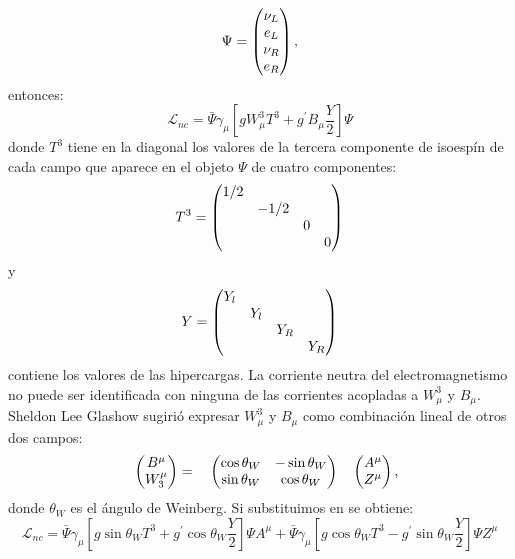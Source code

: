 \documentclass{article}
\theoremstyle{plain}
\theoremstyle{definition}
\begin{document}
	\[
	\Psi = \left(\begin{array}{@{}c@{}}
	\nu_L  \\
	e_L \\
	\nu_R \\
	e_R
	\end{array} \right),
	\]
	entonces:
	\begin{dmath}\label{NeutralCurrentLagrangian}
	\mathcal{L}_{nc} = \bar{\Psi}\gamma_\mu\left[g W_\mu^3T^3 + g^\prime B_\mu\frac{Y}{2}\right]\Psi
		\end{dmath}
	 donde \(T^3\) tiene en la diagonal los valores de la tercera componente de isoespín de cada campo que aparece en el objeto \(\Psi\) de cuatro componentes:
	\[
	T^3 = \left(\begin{array}{@{}cccc@{}}
	1/2 & & & \\
	& -1/2 & & \\
	& & 0 &  \\
	& & & 0
	\end{array} \right)
	\]
	y 
	\[
	Y = \left(\begin{array}{@{}cccc@{}}
	Y_l & & & \\
	& Y_l & & \\
	& & Y_R &  \\
	& & & Y_R
	\end{array} \right)
	\]
	contiene los valores de las hipercargas.
	La corriente neutra del electromagnetismo no puede ser identificada con ninguna de las corrientes acopladas a \(W^3_\mu\) y \(B_\mu\). Sheldon Lee Glashow sugirió expresar \(W^3_\mu\) y \(B_\mu\) como combinación lineal de otros dos campos:
	\[
	\quad \left(\begin{array}{@{}c@{}}
	B^\mu \\
	W_3^\mu
	\end{array} \right)
	=
	\quad
	\left(\begin{array}{@{}cc@{}}
	\cos\theta_W & -\sin\theta_W \\
	\sin\theta_W & \cos\theta_W
	\end{array} \right)
	\quad
	\left(\begin{array}{@{}c@{}}
	A^\mu \\
	Z^\mu
	\end{array} \right),
	\]
	donde \(\theta_W\) es el ángulo de Weinberg. Si substituimos en  se obtiene:	
	\begin{dmath}
		\mathcal{L}_{nc}=\bar{\Psi}\gamma_{\mu}\left[g\sin\theta_WT^3+g^\prime\cos\theta_W\frac{Y}{2}\right]\Psi A^\mu+\bar{\Psi}\gamma_{\mu}\left[g\cos\theta_WT^3 - g^\prime\sin\theta_W\frac{Y}{2}\right]\Psi Z^\mu
	\end{dmath}
\end{document}
